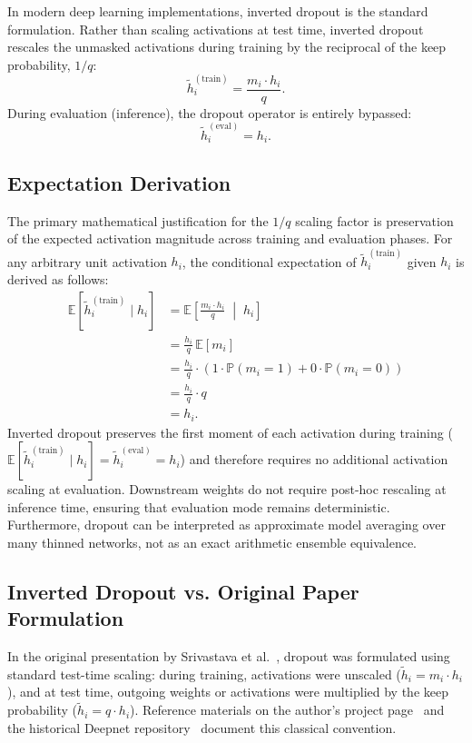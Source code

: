 \documentclass[conference]{IEEEtran}
\begin{document}
In modern deep learning implementations, inverted dropout is the standard formulation. Rather than scaling activations at test time, inverted dropout rescales the unmasked activations during training by the reciprocal of the keep probability, $1/q$:
\begin{equation}
\tilde{h}_i^{(\text{train})} = \frac{m_i \cdot h_i}{q}.
\end{equation}
During evaluation (inference), the dropout operator is entirely bypassed:
\begin{equation}
\tilde{h}_i^{(\text{eval})} = h_i.
\end{equation}

\subsection{Expectation Derivation}
The primary mathematical justification for the $1/q$ scaling factor is preservation of the expected activation magnitude across training and evaluation phases. For any arbitrary unit activation $h_i$, the conditional expectation of $\tilde{h}_i^{(\text{train})}$ given $h_i$ is derived as follows:
\begin{align}
\mathbb{E}\left[\tilde{h}_i^{(\text{train})} \mid h_i\right] &= \mathbb{E}\left[\frac{m_i \cdot h_i}{q} \;\middle|\; h_i\right] \\
&= \frac{h_i}{q} \, \mathbb{E}\left[m_i\right] \\
&= \frac{h_i}{q} \cdot \left(1 \cdot \mathbb{P}(m_i=1) + 0 \cdot \mathbb{P}(m_i=0)\right) \\
&= \frac{h_i}{q} \cdot q \\
&= h_i.
\end{align}
Inverted dropout preserves the first moment of each activation during training ($\mathbb{E}\left[\tilde{h}_i^{(\text{train})} \mid h_i\right] = \tilde{h}_i^{(\text{eval})} = h_i$) and therefore requires no additional activation scaling at evaluation. Downstream weights do not require post-hoc rescaling at inference time, ensuring that evaluation mode remains deterministic. Furthermore, dropout can be interpreted as approximate model averaging over many thinned networks, not as an exact arithmetic ensemble equivalence.

\subsection{Inverted Dropout vs. Original Paper Formulation}
In the original presentation by Srivastava et al.~\cite{srivastava2014dropout}, dropout was formulated using standard test-time scaling: during training, activations were unscaled ($\tilde{h}_i = m_i \cdot h_i$), and at test time, outgoing weights or activations were multiplied by the keep probability ($\tilde{h}_i = q \cdot h_i$). Reference materials on the author's project page~\cite{srivastava2014dropoutpage} and the historical Deepnet repository~\cite{srivastava2014deepnet} document this classical convention.
\end{document}

